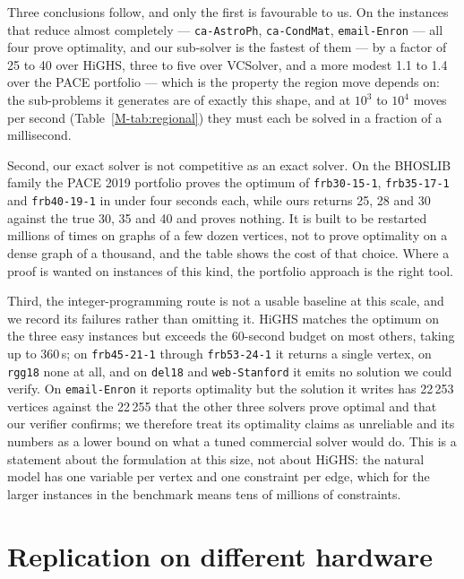 \documentclass[preprint,authoryear,11pt]{elsarticle}
\theoremstyle{definition}
\begin{document}
Three conclusions follow, and only the first is favourable to us. On the
instances that reduce almost completely --- \texttt{ca-AstroPh},
\texttt{ca-CondMat}, \texttt{email-Enron} --- all four prove optimality, and our
sub-solver is the fastest of them --- by a factor of 25 to 40 over HiGHS, three
to five over VCSolver, and a more modest 1.1 to 1.4 over the PACE portfolio ---
which is the property
the region move depends on: the sub-problems it generates are of exactly this
shape, and at $10^3$ to $10^4$ moves per second (Table~\ref{M-tab:regional}) they must each be solved in a fraction
of a millisecond.

Second, our exact solver is not competitive as an exact solver. On the BHOSLIB
family the PACE 2019 portfolio proves the optimum of \texttt{frb30-15-1},
\texttt{frb35-17-1} and \texttt{frb40-19-1} in under four seconds each, while
ours returns 25, 28 and 30 against the true 30, 35 and 40 and proves nothing.
It is built to be restarted millions of times on graphs of a few dozen vertices,
not to prove optimality on a dense graph of a thousand, and the table shows the
cost of that choice. Where a proof is wanted on instances of this kind, the
portfolio approach is the right tool.

Third, the integer-programming route is not a usable baseline at this scale, and
we record its failures rather than omitting it. HiGHS matches the optimum on the
three easy instances but exceeds the 60-second budget on most others, taking up
to 360\,s; on \texttt{frb45-21-1} through \texttt{frb53-24-1} it returns a single
vertex, on \texttt{rgg18} none at all, and on \texttt{del18} and
\texttt{web-Stanford} it emits no solution we could verify. On
\texttt{email-Enron} it reports optimality but the solution it writes has 22\,253
vertices against the 22\,255 that the other three solvers prove optimal and that
our verifier confirms; we therefore treat its optimality claims as unreliable
and its numbers as a lower bound on what a tuned commercial solver would do.
This is a statement about the formulation at this size, not about HiGHS: the
natural model has one variable per vertex and one constraint per edge, which for
the larger instances in the benchmark means tens of millions of constraints.




\section{Replication on different hardware}
\label{sec:replication}
\end{document}
